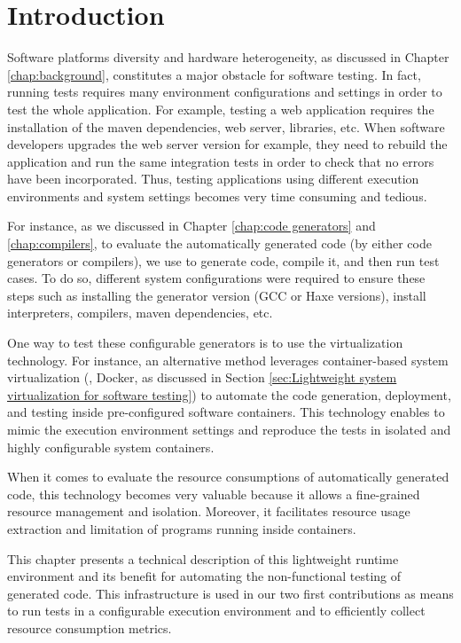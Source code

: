 \section{Introduction}

Software platforms diversity and hardware heterogeneity, as discussed in Chapter \ref{chap:background}, constitutes a major obstacle for software testing. In fact, running tests requires many environment configurations and settings in order to test the whole application. For example, testing a web application requires the installation of the maven dependencies, web server, libraries, etc. When software developers upgrades the web server version for example, they need to rebuild the application and run the same integration tests in order to check that no errors  have been incorporated. Thus, testing applications using different execution environments and system settings becomes very time consuming and tedious.

For instance, as we discussed in Chapter \ref{chap:code generators} and \ref{chap:compilers}, to evaluate the automatically generated code (by either code generators or compilers), we use to generate code, compile it, and then run test cases. To do so, different system configurations were required to ensure these steps such as installing the generator version (GCC or Haxe versions), install interpreters, compilers, maven dependencies, etc. 

One way to test these configurable generators is to use the virtualization technology. For instance, an alternative method leverages container-based system virtualization (\eg, Docker, as discussed in Section \ref{sec:Lightweight system virtualization for software testing}) to automate the code generation, deployment, and testing inside pre-configured software containers.
This technology enables to mimic the execution environment settings and reproduce the tests in isolated and highly configurable system containers.

When it comes to evaluate the resource consumptions of automatically generated code, this technology becomes very valuable because it allows a fine-grained resource management and isolation. Moreover, it facilitates resource usage extraction and limitation of programs running inside containers. 

This chapter presents a technical description of this lightweight runtime environment and its benefit for automating the non-functional testing of generated code. This infrastructure is used in our two first contributions as means to run tests in a configurable execution environment and to efficiently collect resource consumption metrics.


